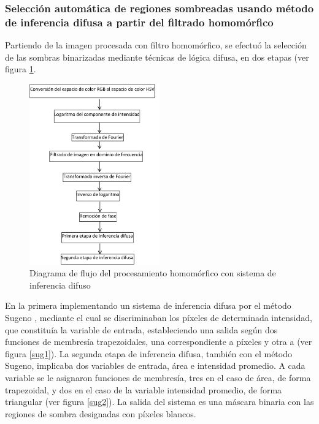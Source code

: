 \subsubsection{Selección automática de regiones sombreadas usando método de inferencia difusa a partir del filtrado homomórfico} \label{metod_homo_fuzzy}
Partiendo de la imagen procesada con filtro homomórfico, se efectuó la selección de las sombras binarizadas mediante técnicas de lógica difusa, en dos etapas (ver figura \ref{flowchart_homofuzzy}. \\

\begin{figure}[h!]
    \centering
    \includegraphics[width=0.5\textwidth]{Imagenes/Homomorfico/flowchart_fuzzy.png}
     \hfill
     \caption{Diagrama de flujo del procesamiento homomórfico con sistema de inferencia difuso}
    \label{flowchart_homofuzzy}
\end{figure}

En la primera implementando un sistema de inferencia difusa por el método Sugeno \cite{takagi_fuzzy_1985, sugeno_structure_1988}, mediante el cual se discriminaban los píxeles de determinada intensidad, que constituía la variable de entrada, estableciendo una salida según dos funciones de membresía trapezoidales, una correspondiente a píxeles  y otra a  (ver figura \ref{sug1}). La segunda etapa de inferencia difusa, también con el método Sugeno, implicaba dos variables de entrada, área e intensidad promedio. A cada variable se le asignaron funciones de membresía, tres en el caso de área, de forma trapezoidal, y dos en el caso de la variable intensidad promedio, de forma triangular (ver figura \ref{sug2}). La salida del sistema es una máscara binaria con las regiones de sombra designadas con píxeles blancos. 

